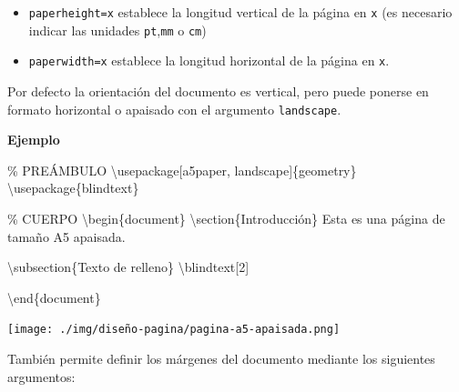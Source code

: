 \documentclass[
  a4paper,
]{scrreport}
\newenvironment{Shaded}{\begin{snugshade}}{\end{snugshade}}
\newcommand{\BuiltInTok}[1]{\textcolor[rgb]{0.00,0.23,0.31}{#1}}
\newcommand{\CommentTok}[1]{\textcolor[rgb]{0.37,0.37,0.37}{#1}}
\newcommand{\ExtensionTok}[1]{\textcolor[rgb]{0.00,0.23,0.31}{#1}}
\newcommand{\FunctionTok}[1]{\textcolor[rgb]{0.28,0.35,0.67}{#1}}
\newcommand{\KeywordTok}[1]{\textcolor[rgb]{0.00,0.23,0.31}{#1}}
\newcommand{\NormalTok}[1]{\textcolor[rgb]{0.00,0.23,0.31}{#1}}
\providecommand{\tightlist}{%
  \setlength{\itemsep}{0pt}\setlength{\parskip}{0pt}}\usepackage{longtable,booktabs,array}
\begin{document}
\begin{itemize}
\tightlist
\item
  \texttt{paperheight=x} establece la longitud vertical de la página en
  \texttt{x} (es necesario indicar las unidades \texttt{pt},\texttt{mm}
  o \texttt{cm})
\item
  \texttt{paperwidth=x} establece la longitud horizontal de la página en
  \texttt{x}.
\end{itemize}

Por defecto la orientación del documento es vertical, pero puede ponerse
en formato horizontal o apaisado con el argumento \texttt{landscape}.

\textbf{Ejemplo}

\begin{Shaded}
\begin{Highlighting}[]
\CommentTok{\% PREÁMBULO}
\BuiltInTok{\textbackslash{}usepackage}\NormalTok{[a5paper, landscape]\{}\ExtensionTok{geometry}\NormalTok{\}}
\BuiltInTok{\textbackslash{}usepackage}\NormalTok{\{}\ExtensionTok{blindtext}\NormalTok{\}}

\CommentTok{\% CUERPO}
\KeywordTok{\textbackslash{}begin}\NormalTok{\{}\ExtensionTok{document}\NormalTok{\}}
\KeywordTok{\textbackslash{}section}\NormalTok{\{Introducción\}}
\NormalTok{Esta es una página de tamaño A5 apaisada.}

\KeywordTok{\textbackslash{}subsection}\NormalTok{\{Texto de relleno\}}
\FunctionTok{\textbackslash{}blindtext}\NormalTok{[2]}

\KeywordTok{\textbackslash{}end}\NormalTok{\{}\ExtensionTok{document}\NormalTok{\}}
\end{Highlighting}
\end{Shaded}

\begin{tcolorbox}[enhanced jigsaw, bottomrule=.15mm, leftrule=.75mm, opacityback=0, titlerule=0mm, bottomtitle=1mm, colbacktitle=quarto-callout-note-color!10!white, arc=.35mm, toprule=.15mm, colframe=quarto-callout-note-color-frame, title={Salida}, coltitle=black, colback=white, breakable, toptitle=1mm, rightrule=.15mm, left=2mm, opacitybacktitle=0.6]

\texttt{[image: ./img/diseño-pagina/pagina-a5-apaisada.png]}

\end{tcolorbox}

También permite definir los márgenes del documento mediante los
siguientes argumentos:
\end{document}
